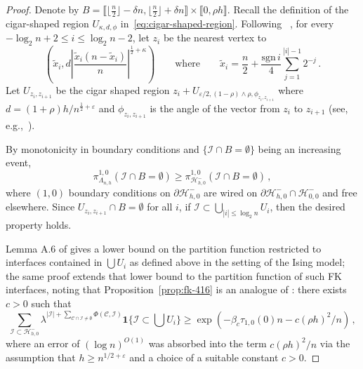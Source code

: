 \documentclass[reqno,11pt]{amsart}
\numberwithin{equation}{section}
\renewcommand{\epsilon}{\varepsilon}
\theoremstyle{definition}{
\newtheorem{example}[theorem]{Example}
\newtheorem{definition}[theorem]{Definition}
\newtheorem*{definition*}{Definition}
\newtheorem{problem}[theorem]{Problem}
\newtheorem{question}[theorem]{Question}
\newtheorem{remark}[theorem]{Remark}
}
\newcommand{\llb }{\llbracket}
\newcommand{\rrb }{\rrbracket}
\renewcommand{\epsilon}{\varepsilon}
\begin{document}
\begin{proof}
Denote by $B= \llb \lfloor \frac n2 \rfloor -\delta n, \lfloor \frac n2 \rfloor +\delta n\rrb \times \llb 0,\rho h\rrb$.
Recall the definition of the cigar-shaped region $U_{\kappa, d,\phi}$ in~\eqref{eq:cigar-shaped-region}.
Following ~\cite{MaTo10}, for every $-\log_2 n +2\leq i \leq \log_2 n-2$, let $z_i$ be the nearest vertex to
\[\left(\tilde x_i, d\left|\frac {\tilde x_i(n-\tilde x_i)}{n} \right|^{\frac 12+\kappa}\right)\qquad \mbox{where}\qquad \tilde x_i= \frac n2 + \frac {\mbox{sgn}\,i}{4} \sum_{j=1}^{|i|-1} 2^{-j}\,.
\]
Let $U_{z_i,z_{i+1}}$ be the cigar shaped region $z_i+U_{\epsilon/2,(1-\rho)\wedge \rho,\phi_{z_i,z_{i+1}}}$ where $d=(1+\rho) h/n^{\frac 12 + \epsilon}$ and $\phi_{z_i,z_{i+1}}$ is the angle of the vector from $z_i$ to $z_{i+1}$ (see, e.g.,~\cite[Fig.~8]{MaTo10}).

By monotonicity in boundary conditions and $\{\mathcal I \cap B =\emptyset\}$ being an increasing event, 
\[\pi_{\Lambda_{n,h}}^{1,0} (\mathcal I \cap B = \emptyset ) \geq \pi_{\mathcal H^-_{h,0}}^{1,0}(\mathcal I \cap B = \emptyset)\,,
\]
where $(1,0)$ boundary conditions on $\partial \mathcal H^-_{h,0}$ are wired on $\partial \mathcal H^-_{h,0} \cap \mathcal H^-_{0,0}$ and free elsewhere. Since $U_{z_i,z_{i+1}}\cap B=\emptyset$ for all $i$, if $\mathcal I\subset \bigcup _{|i|\leq \log_2 n}U_i$, then the desired property holds.

Lemma A.6 of \cite{MaTo10} gives  a lower bound on the partition function restricted to interfaces contained in $\bigcup U_i$ as defined above in the setting of the Ising model; the same proof extends that lower bound to the partition function of such FK interfaces, noting that Proposition~\ref{prop:fk-416} is an analogue of \cite[Theorem 4.16]{DKS}: there exists $c>0$ such that
\[\sum _{\mathcal I \subset \mathcal H^-_{h,0}} \lambda^{|\mathcal I| +\sum_{\mathcal C\cap \mathcal I \neq \emptyset} \Phi(\mathcal C,\mathcal I)}\boldsymbol 1\{\mathcal I \subset \mbox{$\bigcup U_i$}\}\geq \exp(-\beta_c \tau_{1,0} (0)  n - c (\rho h)^2/n)\,,
\]
where an error of $(\log n)^{O(1)}$ was absorbed into the term $c (\rho h)^2/n$ via the assumption that $h\geq n^{1/2+\epsilon}$ and a choice of a suitable constant $c>0$.


\end{proof}
\end{document}
